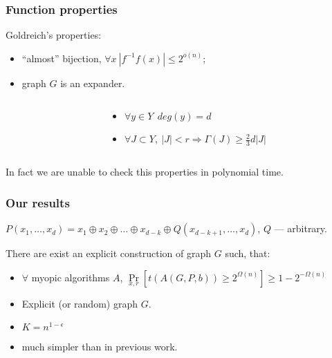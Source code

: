 \begin{frame}
    \frametitle{Function properties}

    \pause
    Goldreich's properties:
    \pause
    \begin{itemize}
	    \item ``almost'' bijection, $\forall x ~ |f^{-1}f(x)| \le 2^{o(n)}$;
    	\pause
        \item graph $G$ is an expander.
    \end{itemize}

    \pause

    \begin{columns}
        \begin{column}{5cm}
            
        \end{column}

        \pause
        \pause
        \pause
        \begin{column}{5cm}
            \begin{itemize}
                \item $\forall y \in Y ~~ deg(y) = d$
            	\pause
	            \item $\forall J \subset Y, ~
            		|J| < r \Rightarrow \Gamma(J) \ge \frac{2}{3}d|J|$
            \end{itemize}
		\end{column}
    \end{columns}

    \pause
    In fact we are unable to check this properties in polynomial time.

\end{frame}

\begin{frame}
	\frametitle{Our results}

	$P(x_1, \ldots, x_d) = x_1 \oplus x_2 \oplus \ldots \oplus x_{d - k} \oplus 
	Q(x_{d - k + 1}, \ldots, x_d)$, $Q$ --- arbitrary.

	\pause
	\begin{theorem}
		There are exist an explicit construction of graph $G$ such, that:
		\begin{itemize}
			\item $\forall$ myopic algorithms $A$,
        		 $\Pr\limits_{x, r}[t(A(G, P, b)) \ge 2^{\Omega(n)}] \ge 1 - 2^{-\Omega(n)}$
		\end{itemize}
	\end{theorem}

    \pause
    \begin{itemize}
	    \item Explicit (or random) graph $G$.
    	\pause
    	\item $K = n^{1 - \epsilon}$
    	\pause
    	\item much simpler than in previous work.
    \end{itemize}
\end{frame}

